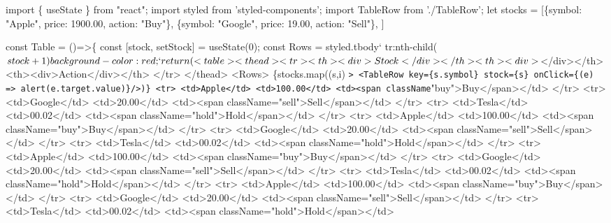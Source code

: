 \documentclass[11pt]{article}
\date{\today}
\title{}
\begin{document}
\tableofcontents

import \{ useState \} from "react";
import styled from 'styled-components';
import TableRow from './TableRow';
let stocks = [\{symbol: "Apple", price: 1900.00, action: "Buy"\},
	      \{symbol: "Google", price: 19.00, action: "Sell"\},
	     ]


const Table = ()=>\{
    const [stock, setStock] = useState(0);
    const Rows = styled.tbody`
        tr:nth-child(\({stock+1}) {
            background-color: red;
        }
    `
    return (
	  <table>
	  <thead>
            <tr>
              <th><div>Stock</div></th>
              <th><div>\)</div></th>
              <th><div>Action</div></th>
          </tr>
	  </thead>
	  <Rows>
	    \{stocks.map((s,i) \texttt{> <TableRow key=\{s.symbol\} stock=\{s\} onClick=\{(e) => alert(e.target.value)\}/>)\}
            <tr>
              <td>Apple</td>
              <td>100.00</td>
              <td><span className}"buy">Buy</span></td>
            </tr>
            <tr>
              <td>Google</td>
              <td>20.00</td>
              <td><span className="sell">Sell</span></td>
            </tr>
            <tr>
              <td>Tesla</td>
              <td>00.02</td>
              <td><span className="hold">Hold</span></td>
            </tr>
            <tr>
              <td>Apple</td>
              <td>100.00</td>
              <td><span className="buy">Buy</span></td>
            </tr>
            <tr>
              <td>Google</td>
              <td>20.00</td>
              <td><span className="sell">Sell</span></td>
            </tr>
            <tr>
              <td>Tesla</td>
              <td>00.02</td>
              <td><span className="hold">Hold</span></td>
            </tr>
            <tr>
              <td>Apple</td>
              <td>100.00</td>
              <td><span className="buy">Buy</span></td>
            </tr>
            <tr>
              <td>Google</td>
              <td>20.00</td>
              <td><span className="sell">Sell</span></td>
            </tr>
            <tr>
              <td>Tesla</td>
              <td>00.02</td>
              <td><span className="hold">Hold</span></td>
            </tr>
            <tr>
              <td>Apple</td>
              <td>100.00</td>
              <td><span className="buy">Buy</span></td>
            </tr>
            <tr>
              <td>Google</td>
              <td>20.00</td>
              <td><span className="sell">Sell</span></td>
            </tr>
            <tr>
              <td>Tesla</td>
              <td>00.02</td>
              <td><span className="hold">Hold</span></td>
\end{document}
